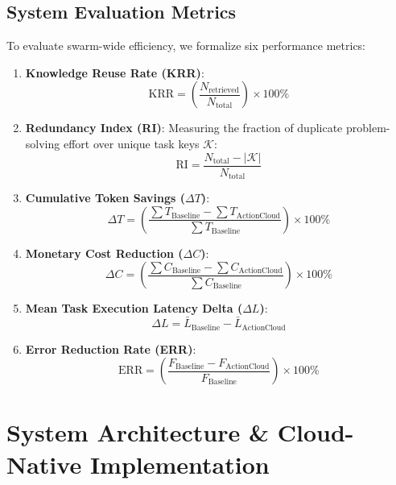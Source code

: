 \documentclass[lettersize,journal]{IEEEtran}
\begin{document}
\subsection{System Evaluation Metrics}
To evaluate swarm-wide efficiency, we formalize six performance metrics:
\begin{enumerate}
    \item \textbf{Knowledge Reuse Rate (KRR)}:
    \begin{equation}
    \text{KRR} = \left( \frac{N_{\text{retrieved}}}{N_{\text{total}}} \right) \times 100\%
    \end{equation}
    \item \textbf{Redundancy Index (RI)}: Measuring the fraction of duplicate problem-solving effort over unique task keys $\mathcal{K}$:
    \begin{equation}
    \text{RI} = \frac{N_{\text{total}} - |\mathcal{K}|}{N_{\text{total}}}
    \end{equation}
    \item \textbf{Cumulative Token Savings ($\Delta T$)}:
    \begin{equation}
    \Delta T = \left( \frac{\sum T_{\text{Baseline}} - \sum T_{\text{ActionCloud}}}{\sum T_{\text{Baseline}}} \right) \times 100\%
    \end{equation}
    \item \textbf{Monetary Cost Reduction ($\Delta C$)}:
    \begin{equation}
    \Delta C = \left( \frac{\sum C_{\text{Baseline}} - \sum C_{\text{ActionCloud}}}{\sum C_{\text{Baseline}}} \right) \times 100\%
    \end{equation}
    \item \textbf{Mean Task Execution Latency Delta ($\Delta L$)}:
    \begin{equation}
    \Delta L = \bar{L}_{\text{Baseline}} - \bar{L}_{\text{ActionCloud}}
    \end{equation}
    \item \textbf{Error Reduction Rate (ERR)}:
    \begin{equation}
    \text{ERR} = \left( \frac{F_{\text{Baseline}} - F_{\text{ActionCloud}}}{F_{\text{Baseline}}} \right) \times 100\%
    \end{equation}
\end{enumerate}

\section{System Architecture \& Cloud-Native Implementation}
\end{document}

